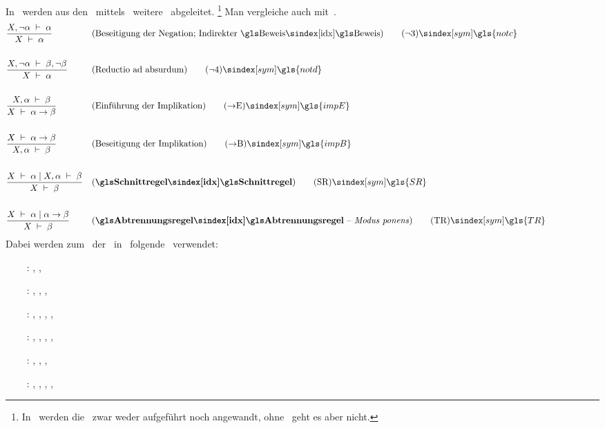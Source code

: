 {In~\cite{bib:Rautenberg} werden aus den \Basisregeln\ mittels \zulaessigerTransformationen\ weitere \Schlussregeln\ abgeleitet.%
\footnote{%
	In~\cite{bib:Rautenberg} werden die \Identitaetsregeln\ zwar weder aufgeführt noch angewandt, ohne \Substitution\ geht es aber nicht.
}
Man vergleiche auch mit~\cite{bib:NatuerlichesSchliessen}.
%
\begin{align}
	& \frac{X,\lnot\alpha\derive\alpha}{X\derive\alpha}
	& & (\text{Beseitigung der Negation; Indirekter \Beweis})
	\tag{\tagnotc} \sym{\gls{notc}} \label{def:notc}
	\\\\
	& \frac{X,\lnot\alpha\derive\beta,\lnot\beta}{X\derive\alpha}
	& & (\text{Reductio ad absurdum})
	\tag{\tagnotd} \sym{\gls{notd}} \label{def:notd}
	\\\\
	& \frac{X,\alpha\derive\beta}{X\derive\alpha\limp\beta}
	& & (\text{Einführung der Implikation})
	\tag{\tagimpE} \sym{\gls{impE}} \label{def:impE}
	\\\\
	& \frac{X\derive\alpha\limp\beta}{X,\alpha\derive\beta}
	& & (\text{Beseitigung der Implikation})
	\tag{\tagimpB} \sym{\gls{impB}} \label{def:impB}
	\\\\
	& \frac{X\derive\alpha \srand X,\alpha\derive\beta}{X\derive\beta}
	& & (\text{\defn{\Schnittregel}})
	\tag{\tagSR} \sym{\gls{SR}} \label{def:SR}
	\\\\
	& \frac{X\derive\alpha \srand \alpha\limp\beta}{X\derive\beta}
	& & (\text{\defn{\Abtrennungsregel} -- \emph{Modus ponens}})
	\tag{\tagTR} \sym{\gls{TR}} \label{def:TR}
	\formulatoleft
\end{align}
%
Dabei werden zum \Beweis\ der \Schlussregeln\ in~\cite{bib:Rautenberg} folgende \Basisregeln\ verwendet:
\begin{itemize}
	\renewcommand*{\itemindent}{1cm}
	\renewcommand*{\labelsep}{5pt}
	\item[\tagnotc~:] \tagAR, \tagMR,           \tagnotb
	\item[\tagnotd~:] \tagAR, \tagMR, \tagnota, \tagnotb
	\item[\tagimpE~:] \tagAR, \tagMR, \tagnota, \tagnotb, \tagandE
	\item[\tagimpB~:] \tagAR, \tagMR, \tagnota, \tagnotb          , \tagandB
	\item[\tagSR  ~:] \tagAR, \tagMR, \tagnota, \tagnotb
	\item[\tagTR  ~:] \tagAR, \tagMR, \tagnota, \tagnotb, \tagandE
\end{itemize}
%
}
